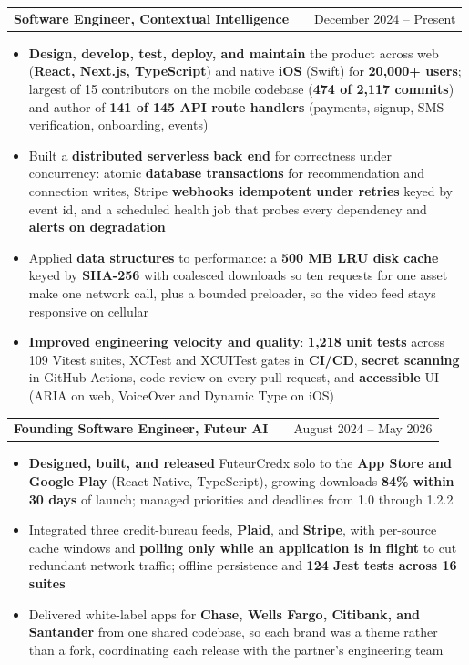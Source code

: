 \documentclass[a4paper,9.5pt]{article}
\makeatletter
\newenvironment{joblong}[2]
    {
    \begin{tabularx}{\linewidth}{@{}l X r@{}}
    \textbf{#1} & \hfill & #2 \\[0pt]
    \end{tabularx}
    \begin{minipage}[t]{\linewidth}
    \begin{itemize}[nosep,after=\strut, leftmargin=1em, itemsep=1pt,label=\textbullet]
    }
    {
    \end{itemize}
    \end{minipage}
    }
\makeatother
\begin{document}
\begin{joblong}{Software Engineer, Contextual Intelligence \normalfont{(consumer social platform, formerly Luna Social)}}{December 2024 -- Present}
\item \textbf{Design, develop, test, deploy, and maintain} the product across web (\textbf{React, Next.js, TypeScript}) and native \textbf{iOS} (Swift) for \textbf{20,000+ users}; largest of 15 contributors on the mobile codebase (\textbf{474 of 2,117 commits}) and author of \textbf{141 of 145 API route handlers} (payments, signup, SMS verification, onboarding, events)
\item Built a \textbf{distributed serverless back end} for correctness under concurrency: atomic \textbf{database transactions} for recommendation and connection writes, Stripe \textbf{webhooks idempotent under retries} keyed by event id, and a scheduled health job that probes every dependency and \textbf{alerts on degradation}
\item Applied \textbf{data structures} to performance: a \textbf{500 MB LRU disk cache} keyed by \textbf{SHA-256} with coalesced downloads so ten requests for one asset make one network call, plus a bounded preloader, so the video feed stays responsive on cellular
\item \textbf{Improved engineering velocity and quality}: \textbf{1,218 unit tests} across 109 Vitest suites, XCTest and XCUITest gates in \textbf{CI/CD}, \textbf{secret scanning} in GitHub Actions, code review on every pull request, and \textbf{accessible} UI (ARIA on web, VoiceOver and Dynamic Type on iOS)
\end{joblong}

\begin{joblong}{Founding Software Engineer, Futeur AI \normalfont{(fintech: business credit, payments, funding)}}{August 2024 -- May 2026}
\item \textbf{Designed, built, and released} FuteurCredx solo to the \textbf{App Store and Google Play} (React Native, TypeScript), growing downloads \textbf{84\% within 30 days} of launch; managed priorities and deadlines from 1.0 through 1.2.2
\item Integrated three credit-bureau feeds, \textbf{Plaid}, and \textbf{Stripe}, with per-source cache windows and \textbf{polling only while an application is in flight} to cut redundant network traffic; offline persistence and \textbf{124 Jest tests across 16 suites}
\item Delivered white-label apps for \textbf{Chase, Wells Fargo, Citibank, and Santander} from one shared codebase, so each brand was a theme rather than a fork, coordinating each release with the partner's engineering team
\end{joblong}
\end{document}
